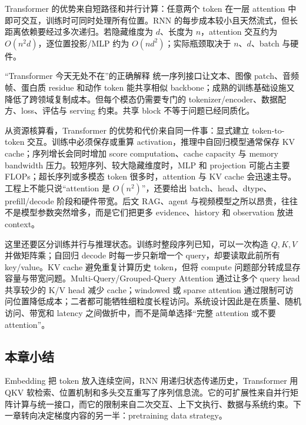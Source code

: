 Transformer 的优势来自短路径和并行计算：任意两个 token 在一层 attention 中即可交互，训练时可同时处理所有位置。RNN 的每步成本较小且天然流式，但长距离依赖要经过多次递归。若隐藏维度为 $d$、长度为 $n$，attention 交互约为 $O(n^2d)$，逐位置投影/MLP 约为 $O(nd^2)$；实际瓶颈取决于 $n$、$d$、batch 与硬件。





\begin{importantbox}{“Transformer 今天无处不在”的正确解释}
统一序列接口让文本、图像 patch、音频帧、蛋白质 residue 和动作 token 能共享相似 backbone；成熟的训练基础设施又降低了跨领域复制成本。但每个模态仍需要专门的 tokenizer/encoder、数据配方、loss、评估与 serving 约束。共享 block 不等于问题已经同质化。
\end{importantbox}

从资源核算看，Transformer 的优势和代价来自同一件事：显式建立 token-to-token 交互。训练中必须保存或重算 activation，推理中自回归模型通常保存 KV cache；序列增长会同时增加 score computation、cache capacity 与 memory bandwidth 压力。较短序列、较大隐藏维度时，MLP 和 projection 可能占主要 FLOPs；超长序列或多模态 token 很多时，attention 与 KV cache 会迅速主导。工程上不能只说“attention 是 $O(n^2)$”，还要给出 batch、head、dtype、prefill/decode 阶段和硬件带宽。后文 RAG、agent 与视频模型之所以昂贵，往往不是模型参数突然增多，而是它们把更多 evidence、history 和 observation 放进 context。

这里还要区分训练并行与推理状态。训练时整段序列已知，可以一次构造 $Q,K,V$ 并做矩阵乘；自回归 decode 时每一步只新增一个 query，却要读取此前所有 key/value。KV cache 避免重复计算历史 token，但将 compute 问题部分转成显存容量与带宽问题。Multi-Query/Grouped-Query Attention 通过让多个 query head 共享较少的 K/V head 减少 cache；windowed 或 sparse attention 通过限制可访问位置降低成本；二者都可能牺牲细粒度长程访问。系统设计因此是在质量、随机访问、带宽和 latency 之间做折中，而不是简单选择“完整 attention 或不要 attention”。

\subsection{本章小结}

Embedding 把 token 放入连续空间，RNN 用递归状态传递历史，Transformer 用 QKV 软检索、位置机制和多头交互重写了序列信息流。它的可扩展性来自并行矩阵计算与统一接口，而它的限制来自二次交互、上下文执行、数据与系统约束。下一章转向决定梯度内容的另一半：pretraining data strategy。

